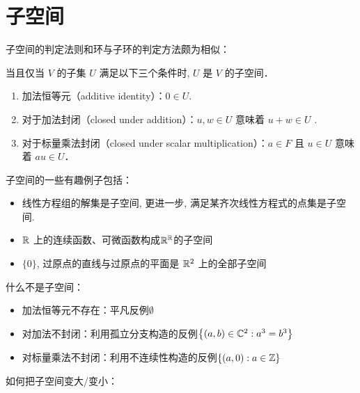 \section{子空间}
子空间的判定法则和环与子环的判定方法颇为相似：
\begin{theorem}[子空间的条件]
    当且仅当 \(V\) 的子集 \(U\) 满足以下三个条件时, \(U\) 是 \(V\) 的子空间．
    \begin{enumerate}
        \item 加法恒等元（additive identity）：\(0 \in U\).
        \item 对于加法封闭（closed under addition）：\(u, w \in U\)
            意味着 \(u + w \in U\) .
        \item 对于标量乘法封闭（closed under scalar
            multiplication）：\(a \in F\)  且 \(u \in U\) 意味着
            \(au \in U\)．
    \end{enumerate}
\end{theorem}
子空间的一些有趣例子包括：
\begin{itemize}
    \item 线性方程组的解集是子空间, 更进一步, 满足某齐次线性方程式的点集是子空间.
    \item \(\mathbb{R}\)
        上的连续函数、可微函数构成\(\mathbb{R}^{\mathbb{R}}\)的子空间
    \item \(\{0\}\), 过原点的直线与过原点的平面是 \(\mathbb{R}^{2}\) 上的全部子空间
\end{itemize}
什么不是子空间：
\begin{itemize}\label{item:subspace counterexample}
    \item 加法恒等元不存在：平凡反例\(\emptyset\)
    \item 对加法不封闭：利用孤立分支构造的反例\(\left\{ (a,b)\in
        \mathbb{C}^{2}: a^{3}=b^{3}\right\}\)
    \item 对标量乘法不封闭：利用不连续性构造的反例\(\left\{(a,0):a\in
        \mathbb{Z}\right\}\)
\end{itemize}

如何把子空间变大/变小：
